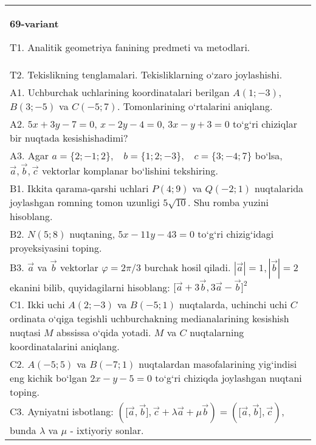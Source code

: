 \documentclass{article}
\begin{document}
\begin{tabular}{m{17cm}}
\textbf{69-variant}
\newline

T1. Analitik geometriya fanining predmeti va metodlari.
 \\
T2. 
Tekislikning tenglamalari. Tekisliklarning o‘zaro joylashishi.
 \\
A1. 
Uchburchak uchlarining koordinatalari berilgan
$A (1;-3) $, $B (3;-5) $ va $C (-5;7) $. Tomonlarining o‘rtalarini
aniqlang.
 \\
A2. 
$5x+3y-7=0$, $x-2y-4=0$, $3x-y+3=0$
to‘g‘ri chiziqlar bir nuqtada kesishishadimi?
 \\
A3. 
Agar \(a = \{ 2; - 1;2\}, \ \ \ \ b = \{ 1;2; - 3\}, \ \ \ \ c = \{ 3; - 4;7\}\) bo‘lsa, $\overrightarrow{a}, \overrightarrow{b}, \overrightarrow{c}$ vektorlar komplanar bo‘lishini tekshiring. \\
B1. Ikkita qarama-qarshi uchlari \(P (4;9) \) va \(Q (-2; 1) \) nuqtalarida joylashgan romning tomon uzunligi \(5\sqrt{10}\). Shu
romba yuzini hisoblang.
 \\
B2. 
\(N (5;8) \) nuqtaning, \(5x-11y-43=0\) to‘g‘ri chizig‘idagi
proyeksiyasini toping.
 \\
B3. 
$\vec{a}$ va $\vec{b}$ vektorlar $\varphi = 2\pi/3$ burchak hosil qiladi. $|\vec{a}| = 1,|\vec{b}| = 2$ ekanini bilib, quyidagilarni hisoblang:
$\lbrack\overrightarrow{a} + 3\overrightarrow{b},3\overrightarrow{a} - \overrightarrow{b}\rbrack^{2}$
 \\
C1. 
Ikki uchi \(A (2; - 3) \) va \(B (-5;1) \) nuqtalarda,
uchinchi uchi $C$ ordinata o‘qiga tegishli uchburchakning
medianalarining kesishish nuqtasi $M$ abssissa o‘qida yotadi.
$M$ va $C$ nuqtalarning koordinatalarini aniqlang.
 \\
C2. 
\(A (-5;5) \) va \(B (-7;1) \) nuqtalardan
masofalarining yig‘indisi eng kichik bo‘lgan \(2x - y - 5 = 0\) to‘g‘ri chiziqda
joylashgan nuqtani toping.
 \\
C3. 
Ayniyatni isbotlang: \((\lbrack\vec{a},\vec{b}\rbrack,\vec{c} + \lambda\vec{a} + \mu\vec{b}) = (\lbrack\vec{a},\vec{b}\rbrack,\vec{c}) \), bunda \(\lambda\) va \(\mu\) - ixtiyoriy sonlar. \\

\end{tabular}
\vspace{1cm}
\end{document}

